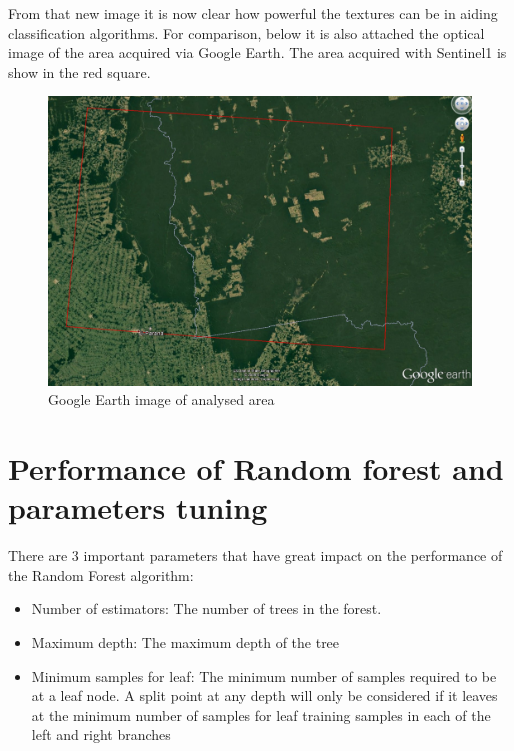 From that new image it is now clear how powerful the textures can be in aiding classification algorithms.
For comparison, below it is also attached the optical image of the area acquired via Google Earth. The area acquired with Sentinel1 is show in the red square.

\begin{figure}[H]
    \centering
    \includegraphics[width=\linewidth]{Chapter5/real_image_google_earth.pdf}
    \caption{Google Earth image of analysed area}
    \label{fig:google_earth_area_sentinel1}
\end{figure}{}

\section{Performance of Random forest and parameters tuning}
There are 3 important parameters that have great impact on the performance of the Random Forest algorithm:
\begin{itemize}
    \item Number of estimators: The number of trees in the forest.
    \item Maximum depth: The maximum depth of the tree
    \item Minimum samples for leaf: The minimum number of samples required to be at a leaf node. A split point at any depth will only be considered if it leaves at the minimum number of samples for leaf training samples in each of the left and right branches
\end{itemize}{}


